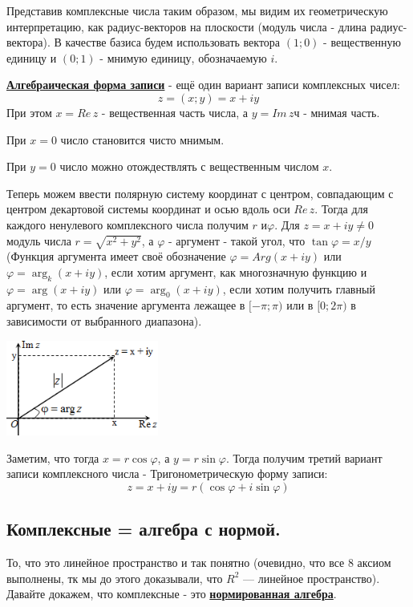 \documentclass[twoside]{book}
\newcommand{\deff}[1]{\underline{\textbf{#1}}}
\begin{document}
Представив комплексные числа таким образом, мы видим их геометрическую интерпретацию, как радиус-векторов на плоскости (модуль числа - длина радиус-вектора). В качестве базиса будем использовать вектора \((1;0)\) - вещественную единицу и \((0;1)\) - мнимую единицу, обозначаемую $i$.

\deff{Алгебраическая форма записи} - ещё один вариант записи комплексных чисел:
$$z=(x;y)=x+iy$$
При этом \(x=Re\,z\) - вещественная часть числа, а \(y=Im\,z\)ч - мнимая часть.

При \(x=0\) число становится чисто мнимым.

При \(y=0\) число можно отождествлять с вещественным числом \(x\).

Теперь можем ввести полярную систему координат с центром, совпадающим с центром декартовой системы координат и осью вдоль оси \(Re\,z\). Тогда для каждого ненулевого комплексного числа получим \(r\) и\(\varphi\). Для \(z=x+iy\neq0\) модуль числа \(r=\sqrt{x^2 + y^2}\), а \(\varphi\) - аргумент - такой угол, что \(\tan{\varphi}= x/y\) (Функция аргумента имеет своё обозначение \(\varphi=Arg(x+iy)\) или \(\varphi=\arg_k(x+iy)\), если хотим аргумент, как многозначную функцию и \(\varphi=\arg(x+iy)\) или \(\varphi=\arg_0(x+iy)\), если хотим получить главный аргумент, то есть значение аргумента лежащее в \([-\pi;\pi)\) или в \([0;2\pi)\) в зависимости от выбранного диапазона).
\begin{center}
    \includegraphics[width=5cm]{Images/Chapter_2/2-2-1.png}
\end{center}
Заметим, что тогда \(x=r\cos{\varphi}\), а \(y=r\sin{\varphi}\). Тогда получим третий вариант записи комплексного числа - Тригонометрическую форму записи: $$z=x+iy=r(\cos{\varphi}+i\sin{\varphi})$$
\subsection{Комплексные = алгебра с нормой.}

То, что это линейное пространство и так понятно (очевидно, что все 8 аксиом выполнены, тк мы до этого доказывали, что \(R^2\) --- линейное пространство). Давайте докажем, что комплексные - это \deff{нормированная алгебра}.
\end{document}

